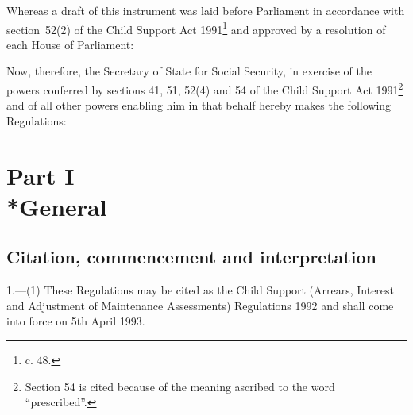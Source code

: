 \documentclass[12pt,a4paper]{article}
\title{\regstitle}
\author{S.I.~1992 No.~1816}
\date{Made 20th July 1992\\Coming into force 5th April 1993}
\begin{document}
\maketitle

\noindent
 Whereas a draft of this instrument was laid before Parliament in accordance with section~52(2) of the Child Support Act 1991\footnote{ c. 48.} and approved by a resolution of each House of Parliament:

Now, therefore, the Secretary of State for Social Security, in exercise of the powers conferred by sections 41, 51, 52(4) and 54 of the Child Support Act 1991\footnote{\frenchspacing Section 54 is cited because of the meaning ascribed to the word “prescribed”.} and of all other powers enabling him in that behalf hereby makes the following Regulations: 

{\sloppy

\tableofcontents

}

\setcounter{secnumdepth}{-2}

\section[Part I --- General]{Part I\\*General}

\renewcommand\parthead{--- Part I}

\subsection[1. Citation, commencement and interpretation]{Citation, commencement and interpretation}

1.—(1) These Regulations may be cited as the Child Support (Arrears, Interest and Adjustment of Maintenance Assessments) Regulations 1992 and shall come into force on 5th April 1993.
\end{document}
